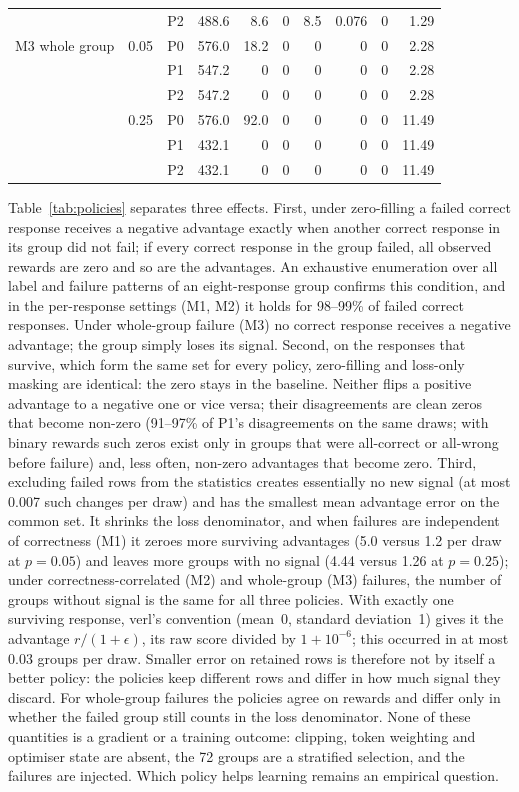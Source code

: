 \documentclass[10pt,a4paper]{article}
\begin{document}
\begin{table}[h]
\begin{tabular}{@{}lllrrrrrrr@{}}
 &  & P2 & 488.6 & 8.6 & 0 & 8.5 & 0.076 & 0 & 1.29 \\
\addlinespace
M3 whole group & 0.05 & P0 & 576.0 & 18.2 & 0 & 0 & 0 & 0 & 2.28 \\
 &  & P1 & 547.2 & 0 & 0 & 0 & 0 & 0 & 2.28 \\
 &  & P2 & 547.2 & 0 & 0 & 0 & 0 & 0 & 2.28 \\
 & 0.25 & P0 & 576.0 & 92.0 & 0 & 0 & 0 & 0 & 11.49 \\
 &  & P1 & 432.1 & 0 & 0 & 0 & 0 & 0 & 11.49 \\
 &  & P2 & 432.1 & 0 & 0 & 0 & 0 & 0 & 11.49 \\
\bottomrule
\end{tabular}
\end{table}

Table~\ref{tab:policies} separates three effects. First, under zero-filling a
failed correct response receives a negative advantage exactly when another
correct response in its group did not fail; if every correct response in the
group failed, all observed rewards are zero and so are the advantages. An
exhaustive enumeration over all label and failure patterns of an
eight-response group confirms this condition, and in the per-response
settings (M1, M2) it holds for 98--99\% of failed correct responses. Under
whole-group failure (M3) no correct response receives a negative advantage;
the group simply loses its signal. Second, on the responses that survive,
which form the same set for every policy, zero-filling and loss-only masking
are identical: the zero stays in the baseline. Neither flips a positive
advantage to a negative one or vice versa; their disagreements are clean
zeros that become non-zero (91--97\% of P1's disagreements on the same draws;
with binary rewards such zeros exist only in groups that were all-correct or
all-wrong before failure) and,
less often, non-zero advantages that become zero. Third, excluding failed rows
from the statistics creates essentially no new signal (at most 0.007 such
changes per draw) and has the smallest mean advantage error on the common
set. It shrinks the loss denominator, and when failures are independent of
correctness (M1) it zeroes more surviving advantages
(5.0 versus 1.2 per draw at $p=0.05$) and leaves more groups with no signal
(4.44 versus 1.26 at $p=0.25$); under correctness-correlated (M2) and
whole-group (M3) failures, the number of groups without signal is the same
for all three policies. With exactly one surviving response, verl's
convention (mean~0, standard deviation~1) gives it the advantage
$r/(1+\epsilon)$, its raw score divided by $1+10^{-6}$; this occurred in at
most 0.03 groups per draw. Smaller error on
retained rows is therefore not by itself a better policy: the policies keep
different rows and differ in how much signal they discard. For whole-group
failures the policies agree on rewards and differ only in whether the failed
group still counts in the loss denominator. None of these quantities is a
gradient or a training outcome: clipping, token weighting and optimiser state
are absent, the 72 groups are a stratified selection, and the failures are
injected. Which policy helps learning remains an empirical question.
\end{document}
